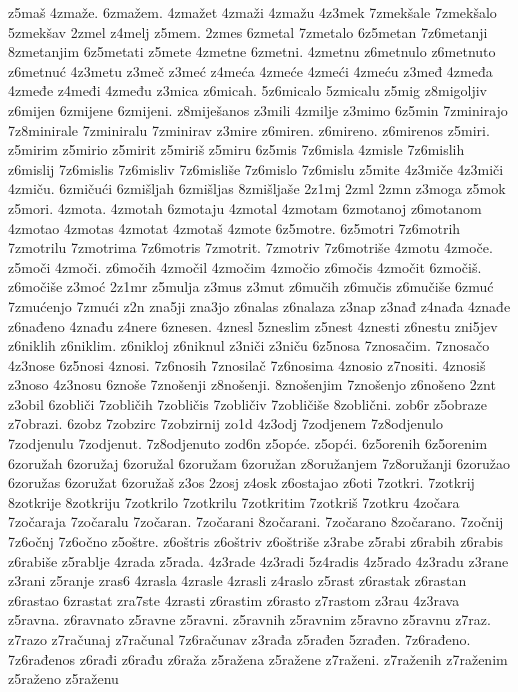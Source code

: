 {z5maš
4zmaže.
6zmažem.
4zmažet
4zmaži
4zmažu
4z3mek
7zmekšale
7zmekšalo
5zmekšav
2zmel
z4melj
z5mem.
2zmes
6zmetal
7zmetalo
6z5metan
7z6metanji
8zmetanjim
6z5metati
z5mete
4zmetne
6zmetni.
4zmetnu
z6metnulo
z6metnuto
z6metnuć
4z3metu
z3meč
z3meć
z4meća
4zmeće
4zmeći
4zmeću
z3međ
4zmeđa
4zmeđe
z4međi
4zmeđu
z3mica
z6micah.
5z6micalo
5zmicalu
z5mig
z8migoljiv
z6mijen
6zmijene
6zmijeni.
z8miješanos
z3mili
4zmilje
z3mimo
6z5min
7zminirajo
7z8minirale
7zminiralu
7zminirav
z3mire
z6miren.
z6mireno.
z6mirenos
z5miri.
z5mirim
z5mirio
z5mirit
z5miriš
z5miru
6z5mis
7z6misla
4zmisle
7z6mislih
z6mislij
7z6mislis
7z6misliv
7z6misliše
7z6mislo
7z6mislu
z5mite
4z3miče
4z3miči
4zmiču.
6zmičući
6zmišljah
6zmišljas
8zmišljaše
2z1mj
2zml
2zmn
z3moga
z5mok
z5mori.
4zmota.
4zmotah
6zmotaju
4zmotal
4zmotam
6zmotanoj
z6motanom
4zmotao
4zmotas
4zmotat
4zmotaš
4zmote
6z5motre.
6z5motri
7z6motrih
7zmotrilu
7zmotrima
7z6motris
7zmotrit.
7zmotriv
7z6motriše
4zmotu
4zmoče.
z5moči
4zmoči.
z6močih
4zmočil
4zmočim
4zmočio
z6močis
4zmočit
6zmočiš.
z6močiše
z3moć
2z1mr
z5mulja
z3mus
z3mut
z6mučih
z6mučis
z6mučiše
6zmuć
7zmućenjo
7zmući
z2n
zna5ji
zna3jo
z6nalas
z6nalaza
z3nap
z3nađ
z4nađa
4znađe
z6nađeno
4znađu
z4nere
6znesen.
4znesl
5zneslim
z5nest
4znesti
z6nestu
zni5jev
z6niklih
z6niklim.
z6nikloj
z6niknul
z3niči
z3niču
6z5nosa
7znosačim.
7znosačo
4z3nose
6z5nosi
4znosi.
7z6nosih
7znosilač
7z6nosima
4znosio
z7nositi.
4znosiš
z3noso
4z3nosu
6znoše
7znošenji
z8nošenji.
8znošenjim
7znošenjo
z6nošeno
2znt
z3obil
6zobliči
7zobličih
7zobličis
7zobličiv
7zobličiše
8zoblični.
zob6r
z5obraze
z7obrazi.
6zobz
7zobzirc
7zobzirnij
zo1d
4z3odj
7zodjenem
7z8odjenulo
7zodjenulu
7zodjenut.
7z8odjenuto
zod6n
z5opće.
z5opći.
6z5orenih
6z5orenim
6zoružah
6zoružaj
6zoružal
6zoružam
6zoružan
z8oružanjem
7z8oružanji
6zoružao
6zoružas
6zoružat
6zoružaš
z3os
2zosj
z4osk
z6ostajao
z6oti
7zotkri.
7zotkrij
8zotkrije
8zotkriju
7zotkrilo
7zotkrilu
7zotkritim
7zotkriš
7zotkru
4zočara
7zočaraja
7zočaralu
7zočaran.
7zočarani
8zočarani.
7zočarano
8zočarano.
7zočnij
7z6očnj
7z6očno
z5oštre.
z6oštris
z6oštriv
z6oštriše
z3rabe
z5rabi
z6rabih
z6rabis
z6rabiše
z5rablje
4zrada
z5rada.
4z3rade
4z3radi
5z4radis
4z5rado
4z3radu
z3rane
z3rani
z5ranje
zras6
4zrasla
4zrasle
4zrasli
z4raslo
z5rast
z6rastak
z6rastan
z6rastao
6zrastat
zra7ste
4zrasti
z6rastim
z6rasto
z7rastom
z3rau
4z3rava
z5ravna.
z6ravnato
z5ravne
z5ravni.
z5ravnih
z5ravnim
z5ravno
z5ravnu
z7raz.
z7razo
z7računaj
z7računal
7z6računav
z3rađa
z5rađen
5zrađen.
7z6rađeno.
7z6rađenos
z6rađi
z6rađu
z6raža
z5ražena
z5ražene
z7raženi.
z7raženih
z7raženim
z5raženo
z5raženu
}
